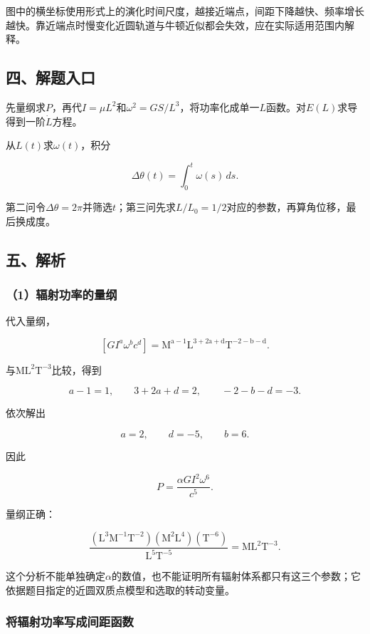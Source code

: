 \documentclass[12pt,a4paper,fontset=fandol]{ctexart}
\begin{document}
图中的横坐标使用形式上的演化时间尺度，越接近端点，间距下降越快、频率增长越快。靠近端点时慢变化近圆轨道与牛顿近似都会失效，应在实际适用范围内解释。

\subsection{四、解题入口}\label{ux56dbux89e3ux9898ux5165ux53e3-6}

先量纲求\(P\)，再代\(I=\mu L^2\)和\(\omega^2=GS/L^3\)，将功率化成单一\(L\)函数。对\(E(L)\)求导得到一阶\(\dot L\)方程。

从\(L(t)\)求\(\omega(t)\)，积分

\[
\Delta\theta(t)=\int_0^t\omega(s)\,ds.
\]

第二问令\(\Delta\theta=2\pi\)并筛选\(t\)；第三问先求\(L/L_0=1/2\)对应的参数，再算角位移，最后换成度。

\subsection{五、解析}\label{ux4e94ux89e3ux6790-6}

\subsubsection{（1）辐射功率的量纲}\label{ux8f90ux5c04ux529fux7387ux7684ux91cfux7eb2}

代入量纲，

\[
[G I^a\omega^bc^d]
=\mathrm{M^{a-1}L^{3+2a+d}T^{-2-b-d}}.
\]

与\(\mathrm{ML^2T^{-3}}\)比较，得到

\[
a-1=1,\qquad 3+2a+d=2,\qquad -2-b-d=-3.
\]

依次解出

\[
a=2,\qquad d=-5,\qquad b=6.
\]

因此

\[
\boxed{P=\frac{\alpha G I^2\omega^6}{c^5}}.
\]

量纲正确：

\[
\frac{(\mathrm{L^3M^{-1}T^{-2}})
(\mathrm{M^2L^4})(\mathrm{T^{-6}})}
{\mathrm{L^5T^{-5}}}
=\mathrm{ML^2T^{-3}}.
\]

这个分析不能单独确定\(\alpha\)的数值，也不能证明所有辐射体系都只有这三个参数；它依据题目指定的近圆双质点模型和选取的转动变量。

\subsubsection{将辐射功率写成间距函数}\label{ux5c06ux8f90ux5c04ux529fux7387ux5199ux6210ux95f4ux8dddux51fdux6570}
\end{document}
